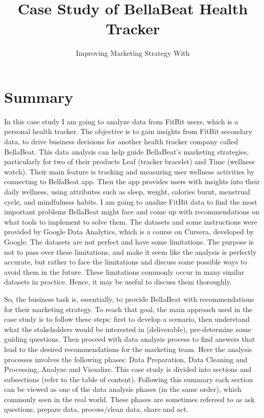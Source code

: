 \documentclass[
]{article}
\title{Case Study of BellaBeat Health Tracker}
\subtitle{Improving Marketing Strategy With}
\author{}
\date{\vspace{-2.5em}}
\begin{document}
\maketitle

\hypertarget{summary}{%
\section{Summary}\label{summary}}

In this case study I am going to analyze data from FitBit users, which
is a personal health tracker. The objective is to gain insights from
FitBit secondary data, to drive business decisions for another health
tracker company called BellaBeat. This data analysis can help guide
BellaBeat's marketing strategies, particularly for two of their products
Leaf (tracker bracelet) and Time (wellness watch). Their main feature is
tracking and measuring user wellness activities by connecting to
BellaBeat app. Then the app provides users with insights into their
daily wellness, using attributes such as sleep, weight, calories burnt,
menstrual cycle, and mindfulness habits. I am going to analize FitBit
data to find the most important problems BellaBeat might face and come
up with recommendations on what tools to implement to solve them. The
datasets and some instructions were provided by Google Data Analytics,
which is a course on Cursera, developed by Google. The datasets are not
perfect and have some limitations. The purpose is not to pass over these
limitations, and make it seem like the analysis is perfectly accurate,
but rather to face the limitations and discuss some possible ways to
avoid them in the future. These limitations commonly occur in many
similar datasets in practice. Hence, it may be useful to discuss them
thoroughly.

So, the business task is, essentially, to provide BellaBeat with
recommendations for their marketing strategy. To reach that goal, the
main approach used in the case study is to follow these steps: first to
develop a scenario, then understand what the stakeholders would be
interested in (deliverable), pre-determine some guiding questions. Then
proceed with data analysis process to find answers that lead to the
desired recommendations for the marketing team. Here the analysis
processes involves the following phases: Data Preparation, Data Cleaning
and Processing, Analyze and Visualize. This case study is divided into
sections and subsections (refer to the table of content). Following this
summary each section can be viewed as one of the data analysis phases
(in the same order), which commonly seen in the real world. These phases
are sometimes refereed to as ask questions, prepare data, process/clean
data, share and act.
\end{document}
